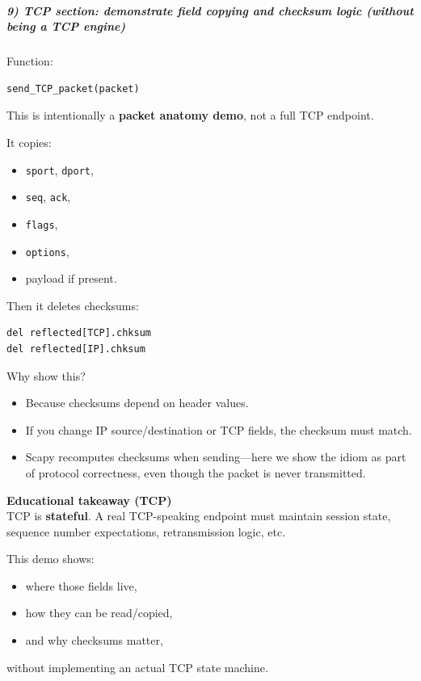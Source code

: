 \subparagraph{9) TCP section: demonstrate field copying and checksum logic (without being a TCP engine)}

Function:

\begin{verbatim}
send_TCP_packet(packet)
\end{verbatim}

This is intentionally a \textbf{packet anatomy demo}, not a full TCP endpoint.

It copies:

\begin{itemize}
\item \texttt{sport}, \texttt{dport},
\item \texttt{seq}, \texttt{ack},
\item \texttt{flags},
\item \texttt{options},
\item payload if present.
\end{itemize}

Then it deletes checksums:

\begin{verbatim}
del reflected[TCP].chksum
del reflected[IP].chksum
\end{verbatim}

Why show this?

\begin{itemize}
\item Because checksums depend on header values.
\item If you change IP source/destination or TCP fields, the checksum must match.
\item Scapy recomputes checksums when sending---here we show the idiom as part of protocol correctness, even though the packet is never transmitted.
\end{itemize}

\begin{framed}
\textbf{Educational takeaway (TCP)}\\
TCP is \textbf{stateful}. A real TCP-speaking endpoint must maintain session state,
sequence number expectations, retransmission logic, etc.

This demo shows:

\begin{itemize}
\item where those fields live,
\item how they can be read/copied,
\item and why checksums matter,
\end{itemize}

without implementing an actual TCP state machine.
\end{framed}


